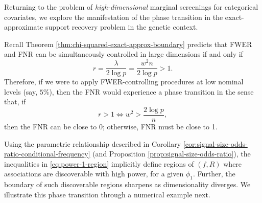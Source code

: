 

Returning to the problem of \emph{high-dimensional} marginal screenings for categorical covariates, we explore the manifestation of the phase transition in the exact-approximate support recovery problem in the genetic context.

Recall Theorem \ref{thm:chi-squared-exact-approx-boundary} predicts that FWER and FNR can be simultaneously controlled in large dimensions if and only if 
\begin{equation}
    r = \frac{\lambda}{2\log{p}} = \frac{w^2n}{2\log{p}} > 1.
\end{equation}
Therefore, if we were to apply FWER-controlling procedures at low nominal levels (say, $5\%$), then the FNR would experience a phase transition in the sense that, if
\begin{equation} \label{eq:power-1-region}
    r>1 \iff w^2 > \frac{2\log{p}}{n},
\end{equation}
then the FNR can be close to 0; otherwise, FNR must be close to 1.

Using the parametric relationship described in Corollary \ref{cor:signal-size-odds-ratio-conditional-frequency} (and Proposition \ref{prop:signal-size-odds-ratio}), 
the inequalities in \eqref{eq:power-1-region} implicitly define regions of $(f, R)$ where associations are discoverable with high power, for a given $\phi_1$.
Further, the boundary of such discoverable regions sharpens as dimensionality diverges. 
We illustrate this phase transition through a numerical example next.



